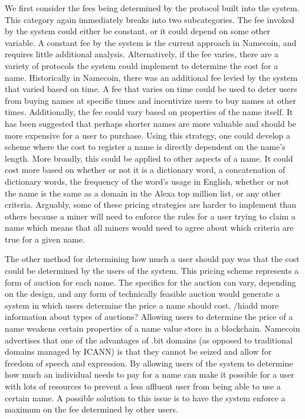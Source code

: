 We first consider the fees being determined by the protocol built into the system. This category again immediately breaks into two subcategories. The fee invoked by the system could either be constant, or it could depend on some other variable. A constant fee by the system is the current approach in Namecoin, and requires little additional analysis. Alternatively, if the fee varies, there are a variety of protocols the system could implement to determine the cost for a name. Historically in Namecoin, there was an additional fee levied by the system that varied based on time. A fee that varies on time could be used to deter users from buying names at specific times and incentivize users to buy names at other times. Additionally, the fee could vary based on properties of the name itself. It has been suggested that perhaps shorter names are more valuable and should be more expensive for a user to purchase. Using this strategy, one could develop a scheme where the cost to register a name is directly dependent on the name's length. More broadly, this could be applied to other aspects of a name. It could cost more based on whether or not it is a dictionary word, a concatenation of dictionary words, the frequency of the word's usage in English, whether or not the name is the same as a domain in the Alexa top million list, or any other criteria. Arguably, some of these pricing strategies are harder to implement than others because a miner will need to enforce the rules for a user trying to claim a name which means that all miners would need to agree about which criteria are true for a given name.

The other method for determining how much a user should pay was that the cost could be determined by the users of the system. This pricing scheme represents a form of auction for each name. The specifics for the auction can vary, depending on the design, and any form of technically feasible auction would generate a system in which users determine the price a name should cost. /hi{add more information about types of auctions?} Allowing users to determine the price of a name weakens certain properties of a name value store in a blockchain. Namecoin advertises that one of the advantages of .bit domains (as opposed to traditional domains managed by ICANN) is that they cannot be seized and allow for freedom of speech and expression. By allowing users of the system to determine how much an individual needs to pay for a name can make it possible for a user with lots of resources to prevent a less affluent user from being able to use a certain name. A possible solution to this issue is to have the system enforce a maximum on the fee determined by other users. 

